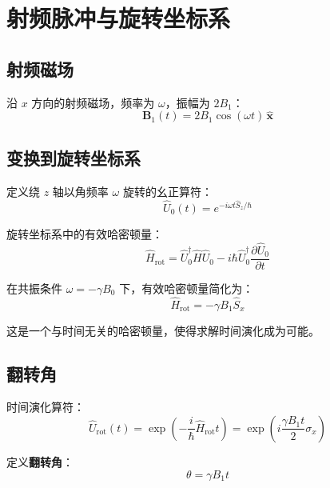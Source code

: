 \documentclass[12pt,a4paper]{article}
\newcommand{\boxeq}[1]{\begin{equation}\boxed{#1}\end{equation}}
\begin{document}
\section{射频脉冲与旋转坐标系}

\subsection{射频磁场}
沿 \(x\) 方向的射频磁场，频率为 \(\omega\)，振幅为 \(2B_1\)：
\begin{equation}
    \mathbf{B}_1(t) = 2B_1 \cos(\omega t)\,\hat{\mathbf{x}}
\end{equation}

\subsection{变换到旋转坐标系}
定义绕 \(z\) 轴以角频率 \(\omega\) 旋转的幺正算符：
\begin{equation}
    \hat{U}_0(t) = e^{-i\omega t \hat{S}_z/\hbar}
\end{equation}

旋转坐标系中的有效哈密顿量：
\boxeq{\hat{H}_{\text{rot}} = \hat{U}_0^\dagger \hat{H} \hat{U}_0 - i\hbar \hat{U}_0^\dagger \frac{\partial \hat{U}_0}{\partial t}}

在共振条件 \(\omega = -\gamma B_0\) 下，有效哈密顿量简化为：
\boxeq{\hat{H}_{\text{rot}} = -\gamma B_1 \hat{S}_x}

这是一个与时间无关的哈密顿量，使得求解时间演化成为可能。

\subsection{翻转角}
时间演化算符：
\begin{equation}
    \hat{U}_{\text{rot}}(t) = \exp\left(-\frac{i}{\hbar}\hat{H}_{\text{rot}} t\right) = \exp\left(i \frac{\gamma B_1 t}{2} \sigma_x\right)
\end{equation}

定义\textbf{翻转角}：
\boxeq{\theta = \gamma B_1 t}
\end{document}
